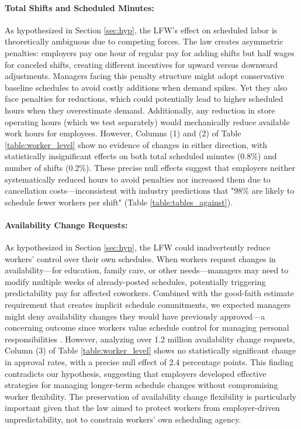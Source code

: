 \documentclass[letterpaper,11pt,leqno]{article}
\theoremstyle{paper}
\begin{document}
\paragraph{Total Shifts and Scheduled Minutes:} As hypothesized in Section \ref{sec:hyp}, the LFW's effect on scheduled labor is theoretically ambiguous due to competing forces. The law creates asymmetric penalties: employers pay one hour of regular pay for adding shifts but half wages for canceled shifts, creating different incentives for upward versus downward adjustments. Managers facing this penalty structure might adopt conservative baseline schedules to avoid costly additions when demand spikes. Yet they also face penalties for reductions, which could potentially lead to higher scheduled hours when they overestimate demand. Additionally, any reduction in store operating hours (which we test separately) would mechanically reduce available work hours for employees. However, Columns (1) and (2) of Table \ref{table:worker_level} show no evidence of changes in either direction, with statistically insignificant effects on both total scheduled minutes (0.8\%) and number of shifts (0.2\%). These precise null effects suggest that employers neither systematically reduced hours to avoid penalties nor increased them due to cancellation costs—inconsistent with industry predictions that "98\% are likely to schedule fewer workers per shift" (Table \ref{table:tables_against}).


\paragraph{Availability Change Requests:} As hypothesized in Section \ref{sec:hyp}, the LFW could inadvertently reduce workers' control over their own schedules. When workers request changes in availability—for education, family care, or other needs—managers may need to modify multiple weeks of already-posted schedules, potentially triggering predictability pay for affected coworkers. Combined with the good-faith estimate requirement that creates implicit schedule commitments, we expected managers might deny availability changes they would have previously approved—a concerning outcome since workers value schedule control for managing personal responsibilities \citep{kelly2011changing,harknett2022who,mas2017valuing}. However, analyzing over 1.2 million availability change requests, Column (3) of Table \ref{table:worker_level} shows no statistically significant change in approval rates, with a precise null effect of 2.4 percentage points. This finding contradicts our hypothesis, suggesting that employers developed effective strategies for managing longer-term schedule changes without compromising worker flexibility. The preservation of availability change flexibility is particularly important given that the law aimed to protect workers from employer-driven unpredictability, not to constrain workers' own scheduling agency.
\end{document}
